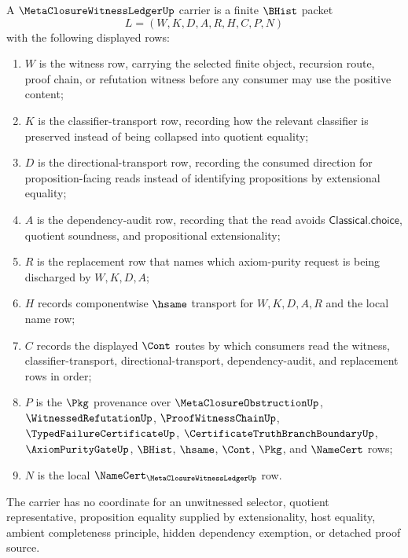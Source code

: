 \begin{definition}
\label{def:meta-closure-witness-ledger-carrier}
A $\MetaClosureWitnessLedgerUp$ carrier is a finite $\BHist$ packet
$$
L=(W,K,D,A,R,H,C,P,N)
$$
with the following displayed rows:
\begin{enumerate}
\item $W$ is the witness row, carrying the selected finite object, recursion route, proof chain, or refutation witness before any consumer may use the positive content;
\item $K$ is the classifier-transport row, recording how the relevant classifier is preserved instead of being collapsed into quotient equality;
\item $D$ is the directional-transport row, recording the consumed direction for proposition-facing reads instead of identifying propositions by extensional equality;
\item $A$ is the dependency-audit row, recording that the read avoids $\mathsf{Classical.choice}$, quotient soundness, and propositional extensionality;
\item $R$ is the replacement row that names which axiom-purity request is being discharged by $W,K,D,A$;
\item $H$ records componentwise $\hsame$ transport for $W,K,D,A,R$ and the local name row;
\item $C$ records the displayed $\Cont$ routes by which consumers read the witness, classifier-transport, directional-transport, dependency-audit, and replacement rows in order;
\item $P$ is the $\Pkg$ provenance over $\MetaClosureObstructionUp$, $\WitnessedRefutationUp$, $\ProofWitnessChainUp$, $\TypedFailureCertificateUp$, $\CertificateTruthBranchBoundaryUp$, $\AxiomPurityGateUp$, $\BHist$, $\hsame$, $\Cont$, $\Pkg$, and $\NameCert$ rows;
\item $N$ is the local $\NameCert_{\MetaClosureWitnessLedgerUp}$ row.
\end{enumerate}
The carrier has no coordinate for an unwitnessed selector, quotient representative, proposition equality supplied by extensionality, host equality, ambient completeness principle, hidden dependency exemption, or detached proof source.
\end{definition}

